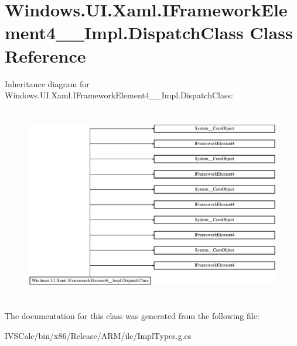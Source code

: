 \hypertarget{class_windows_1_1_u_i_1_1_xaml_1_1_i_framework_element4_____impl_1_1_dispatch_class}{}\section{Windows.\+U\+I.\+Xaml.\+I\+Framework\+Element4\+\_\+\+\_\+\+Impl.\+Dispatch\+Class Class Reference}
\label{class_windows_1_1_u_i_1_1_xaml_1_1_i_framework_element4_____impl_1_1_dispatch_class}
Inheritance diagram for Windows.\+U\+I.\+Xaml.\+I\+Framework\+Element4\+\_\+\+\_\+\+Impl.\+Dispatch\+Class\+:\begin{figure}[H]
\begin{center}
\leavevmode
\includegraphics[height=8.603352cm]{class_windows_1_1_u_i_1_1_xaml_1_1_i_framework_element4_____impl_1_1_dispatch_class}
\end{center}
\end{figure}


The documentation for this class was generated from the following file\+:\begin{DoxyCompactItemize}
\item 
I\+V\+S\+Calc/bin/x86/\+Release/\+A\+R\+M/ilc/Impl\+Types.\+g.\+cs\end{DoxyCompactItemize}
